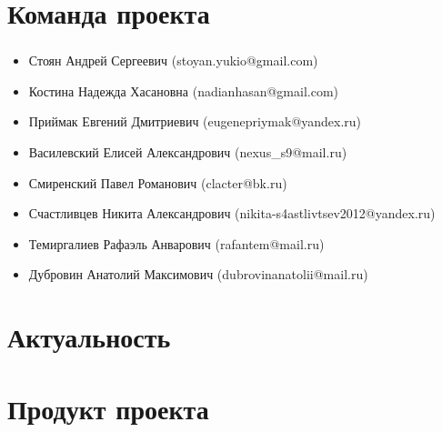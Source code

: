 \documentclass[c]{beamer}  %
\begin{document}
    

\begin{frame}
\end{frame}


\section{Команда проекта}

\begin{frame}
\frametitle{\insertsection} 
\begin{itemize}
    \item Стоян Андрей Сергеевич (stoyan.yukio@gmail.com)
    \item Костина Надежда Хасановна (nadianhasan@gmail.com)
    \item Приймак Евгений Дмитриевич (eugenepriymak@yandex.ru)
    \item Василевский Елисей Александрович (nexus\_s9@mail.ru)
    \item Смиренский Павел Романович (clacter@bk.ru)
    \item Счастливцев Никита Александрович (nikita-s4astlivtsev2012@yandex.ru)
    \item Темиргалиев Рафаэль Анварович (rafantem@mail.ru)
    \item Дубровин Анатолий Максимович (dubrovinanatolii@mail.ru)
\end{itemize}
\end{frame}


\section{Актуальность}

\begin{frame}
\frametitle{\insertsection} 
\framesubtitle{\insertsubsection}
\end{frame}


\section{Продукт проекта}

\begin{frame}
\frametitle{\insertsection} 
\framesubtitle{\insertsubsection}
\end{frame}
\end{document}
